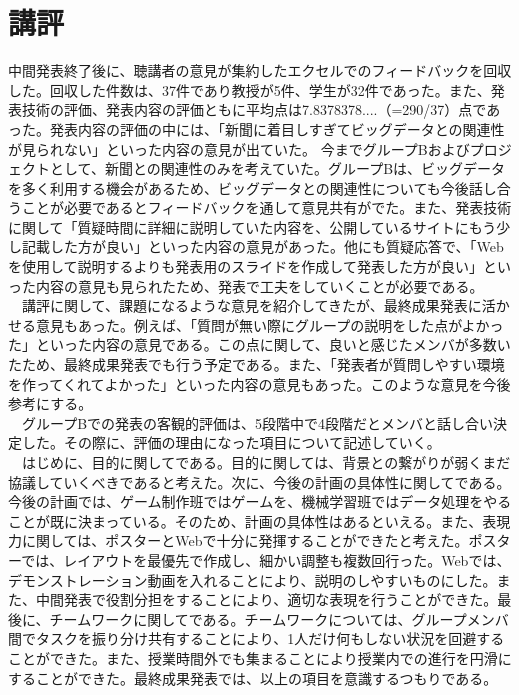 \section{講評}
中間発表終了後に、聴講者の意見が集約したエクセルでのフィードバックを回収した。回収した件数は、37件であり教授が5件、学生が32件であった。また、発表技術の評価、発表内容の評価ともに平均点は7.8378378....（=290/37）点であった。発表内容の評価の中には、「新聞に着目しすぎてビッグデータとの関連性が見られない」といった内容の意見が出ていた。
今までグループBおよびプロジェクトとして、新聞との関連性のみを考えていた。グループBは、ビッグデータを多く利用する機会があるため、ビッグデータとの関連性についても今後話し合うことが必要であるとフィードバックを通して意見共有がでた。また、発表技術に関して「質疑時間に詳細に説明していた内容を、公開しているサイトにもう少し記載した方が良い」といった内容の意見があった。他にも質疑応答で、「Webを使用して説明するよりも発表用のスライドを作成して発表した方が良い」といった内容の意見も見られたため、発表で工夫をしていくことが必要である。\\
　講評に関して、課題になるような意見を紹介してきたが、最終成果発表に活かせる意見もあった。例えば、「質問が無い際にグループの説明をした点がよかった」といった内容の意見である。この点に関して、良いと感じたメンバが多数いたため、最終成果発表でも行う予定である。また、「発表者が質問しやすい環境を作ってくれてよかった」といった内容の意見もあった。このような意見を今後参考にする。\\
　グループBでの発表の客観的評価は、5段階中で4段階だとメンバと話し合い決定した。その際に、評価の理由になった項目について記述していく。\\
　はじめに、目的に関してである。目的に関しては、背景との繋がりが弱くまだ協議していくべきであると考えた。次に、今後の計画の具体性に関してである。今後の計画では、ゲーム制作班ではゲームを、機械学習班ではデータ処理をやることが既に決まっている。そのため、計画の具体性はあるといえる。また、表現力に関しては、ポスターとWebで十分に発揮することができたと考えた。ポスターでは、レイアウトを最優先で作成し、細かい調整も複数回行った。Webでは、デモンストレーション動画を入れることにより、説明のしやすいものにした。また、中間発表で役割分担をすることにより、適切な表現を行うことができた。最後に、チームワークに関してである。チームワークについては、グループメンバ間でタスクを振り分け共有することにより、1人だけ何もしない状況を回避することができた。また、授業時間外でも集まることにより授業内での進行を円滑にすることができた。最終成果発表では、以上の項目を意識するつもりである。
